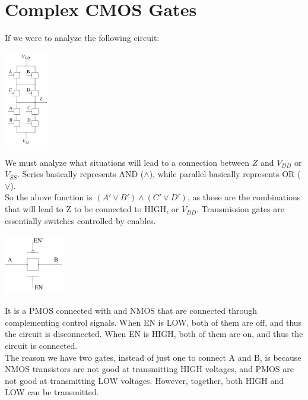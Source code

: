 \documentclass[nobib]{tufte-handout}
\begin{document}
    \section{Complex CMOS Gates}
    If we were to analyze the following circuit:
    \begin{center}
        \includegraphics[width = 75px]{images/complexcmos.png}
    \end{center}
    We must analyze what situations will lead to a connection between $Z$ and $V_{DD}$ or $V_{SS}$. Series basically represents AND ($\land$), while parallel basically represents OR ($\lor$).\\
    So the above function is $(A'\lor B')\land(C'\lor D')$, as those are the combinations that will lead to Z to be connected to HIGH, or $V_{DD}$.
    Transmission gates are essentially switches controlled by enables.\\
    \begin{center}
        \includegraphics[width = 100px]{images/transmission_gate.png}
    \end{center}
    It is a PMOS connected with and NMOS that are connected through complementing control signals. When EN is LOW, both of them are off, and thus the circuit is disconnected. When EN is HIGH, both of them are on, and thus the circuit is connected.\\
    The reason we have two gates, instead of just one to connect A and B, is because NMOS transistors are not good at transmitting HIGH voltages, and PMOS are not good at transmitting LOW voltages. However, together, both HIGH and LOW can be transmitted.\\
\end{document}
